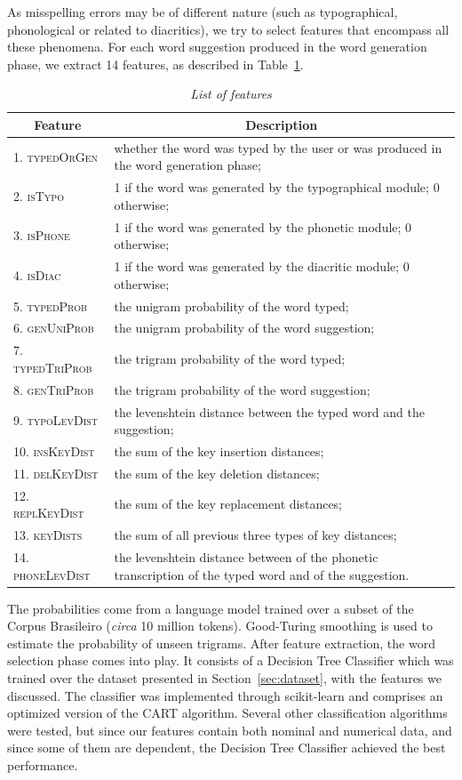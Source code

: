 As misspelling errors may be of different nature (such as typographical, phonological or related to diacritics), we try to select features that encompass all these phenomena. For each word suggestion produced in the word generation phase, we extract 14 features, as described in Table~\ref{tab:features}.
\begin{table}[!ht]
\scriptsize
\centering
\caption{\label{tab:features} {\it List of features}}
\begin{tabular}{|lp{10 cm}|}
\hline
\multicolumn{1}{|c}{\textbf{Feature}} & \multicolumn{1}{c|}{\textbf{Description}} \\ \hline
1. \textsc{typedOrGen} & whether the word was typed by the user or was produced in the word generation phase; \\
2. \textsc{isTypo} & 1 if the word was generated by the typographical module; 0 otherwise; \\
3. \textsc{isPhone} & 1 if the word was generated by the phonetic module; 0 otherwise; \\ 
4. \textsc{isDiac} & 1 if the word was generated by the diacritic module; 0 otherwise; \\
5. \textsc{typedProb} & the unigram probability of the word typed; \\
6. \textsc{genUniProb} & the unigram probability of the word suggestion; \\
7. \textsc{typedTriProb} & the trigram probability of the word typed; \\
8. \textsc{genTriProb} & the trigram probability of the word suggestion; \\
9. \textsc{typoLevDist} & the levenshtein distance between the typed word and the suggestion; \\
10. \textsc{insKeyDist} & the sum of the key insertion distances; \\
11. \textsc{delKeyDist} & the sum of the key deletion distances; \\
12. \textsc{replKeyDist} & the sum of the key replacement distances; \\
13. \textsc{keyDists} & the sum of all previous three types of key distances; \\
14. \textsc{phoneLevDist} & the levenshtein distance between of the phonetic transcription of the typed word and of the suggestion. \\ \hline
\end{tabular}
\end{table}

The probabilities come from a language model trained over a subset of the Corpus Brasileiro (\emph{circa} 10 million tokens). Good-Turing smoothing is used to estimate the probability of unseen trigrams.
After feature extraction, the word selection phase comes into play. It consists of a Decision Tree Classifier which was trained over the dataset presented in Section~\ref{sec:dataset}, with the features we discussed. 
The classifier was implemented through scikit-learn \cite{Pedregosa2011} and comprises an optimized version of the CART algorithm. Several other classification algorithms were tested, but since our features contain both nominal and numerical data, and since some of them are dependent, the Decision Tree Classifier achieved the best performance.

